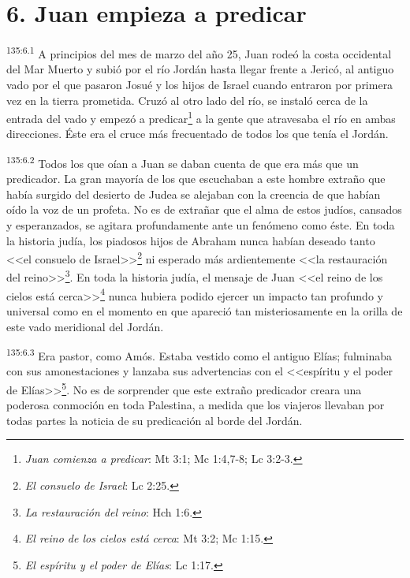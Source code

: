 \section*{6. Juan empieza a predicar}
\par 
\textsuperscript{135:6.1} A principios del mes de marzo del año 25, Juan rodeó la costa occidental del Mar Muerto y subió por el río Jordán hasta llegar frente a Jericó, al antiguo vado por el que pasaron Josué y los hijos de Israel cuando entraron por primera vez en la tierra prometida. Cruzó al otro lado del río, se instaló cerca de la entrada del vado y empezó a predicar\footnote{\textit{Juan comienza a predicar}: Mt 3:1; Mc 1:4,7-8; Lc 3:2-3.} a la gente que atravesaba el río en ambas direcciones. Éste era el cruce más frecuentado de todos los que tenía el Jordán.

\par 
\textsuperscript{135:6.2} Todos los que oían a Juan se daban cuenta de que era más que un predicador. La gran mayoría de los que escuchaban a este hombre extraño que había surgido del desierto de Judea se alejaban con la creencia de que habían oído la voz de un profeta. No es de extrañar que el alma de estos judíos, cansados y esperanzados, se agitara profundamente ante un fenómeno como éste. En toda la historia judía, los piadosos hijos de Abraham nunca habían deseado tanto <<el consuelo de Israel>>\footnote{\textit{El consuelo de Israel}: Lc 2:25.} ni esperado más ardientemente <<la restauración del reino>>\footnote{\textit{La restauración del reino}: Hch 1:6.}. En toda la historia judía, el mensaje de Juan <<el reino de los cielos está cerca>>\footnote{\textit{El reino de los cielos está cerca}: Mt 3:2; Mc 1:15.} nunca hubiera podido ejercer un impacto tan profundo y universal como en el momento en que apareció tan misteriosamente en la orilla de este vado meridional del Jordán.

\par 
\textsuperscript{135:6.3} Era pastor, como Amós. Estaba vestido como el antiguo Elías; fulminaba con sus amonestaciones y lanzaba sus advertencias con el <<espíritu y el poder de Elías>>\footnote{\textit{El espíritu y el poder de Elías}: Lc 1:17.}. No es de sorprender que este extraño predicador creara una poderosa conmoción en toda Palestina, a medida que los viajeros llevaban por todas partes la noticia de su predicación al borde del Jordán.

